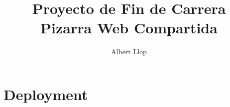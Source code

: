 \documentclass [11pt]{report}
\begin{document}
\author{Albert Llop}
\title{\Huge{\textbf{Proyecto de Fin de Carrera} \\ Pizarra Web Compartida}}
\maketitle
\newpage
\tableofcontents
\chapter{Deployment}

\newpage
\end{document}

